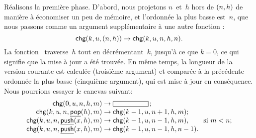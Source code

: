 Réalisons la première phase. D'abord, nous projetons \(n\)~et~\(h\)
hors de \(({n},{h})\) de manière à économiser un peu de mémoire, et
l'ordonnée la plus basse est~\(n\), que nous passons comme un argument
supplémentaire à une autre fonction
:
\begin{equation*}
\textsf{chg}(k,u,({n},{h})) \rightarrow \textsf{chg}(k,u,n,h,n).
\end{equation*}
La fonction~ traverse~\(h\) tout en décrémentant~\(k\),
jusqu'à ce que \(k=0\), ce qui signifie que la mise à jour a été
trouvée. En même temps, la longueur de la version courante est
calculée (troisième argument) et comparée à la précédente ordonnée la
plus basse (cinquième argument), qui est mise à jour en
conséquence. Nous pourrions essayer le canevas suivant:
\begin{equation*}
\begin{array}{@{}r@{\;}l@{\;}l@{}}
\fun{chg}(0,u,n,h,m) & \rightarrow & \fbcode{CCCCCCC}\,;\\
\fun{chg}(k,u,n,\ufun{pop}(h),m) & \rightarrow
                                 & \fun{chg}(k-1,u,n+1,h,m);\\
\fun{chg}(k,u,n,\ufun{push}(x,h),m) & \rightarrow
                   & \fun{chg}(k-1,u,n-1,h,m),\qquad \text{si \(m < n\)};\\
\fun{chg}(k,u,n,\ufun{push}(x,h),m) & \rightarrow
                                    & \fun{chg}(k-1,u,n-1,h,n-1).
\end{array}
\end{equation*}

